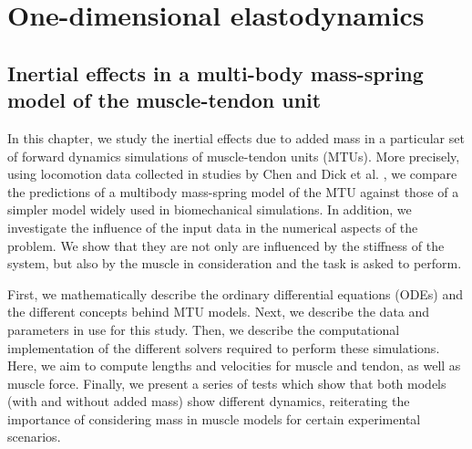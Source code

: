 \documentclass{sfuthesis}
\numberwithin{equation}{chapter}
\numberwithin{figure}{chapter}
\numberwithin{table}{chapter}
\theoremstyle{definition}
\begin{document}
\part{One-dimensional elastodynamics}

\chapter{Inertial effects in a multi-body mass-spring model of the muscle-tendon unit}






In this chapter, we study the inertial effects due to added mass in a particular set of forward dynamics simulations of muscle-tendon units (MTUs). More precisely, using locomotion data collected in studies by Chen \cite{EvanThesis} and Dick et al. \cite{Dick2016}, we compare the predictions of a multibody mass-spring model of the MTU against those of a simpler model widely used in biomechanical simulations. In addition, we investigate the influence of the input data in the numerical aspects of the problem. We show that they are not only are influenced by the stiffness of the system, but also by the muscle in consideration and the task is asked to perform.

First, we mathematically describe the ordinary differential equations (ODEs) and the different concepts behind MTU models. Next, we describe the data and parameters in use for this study. Then, we describe the computational implementation of the different solvers required to perform these simulations. Here, we aim to compute lengths and velocities for muscle and tendon, as well as muscle force. Finally, we present a series of tests which show that both models (with and without added mass) show different dynamics, reiterating the importance of considering mass in muscle models for certain experimental scenarios.
\end{document}
